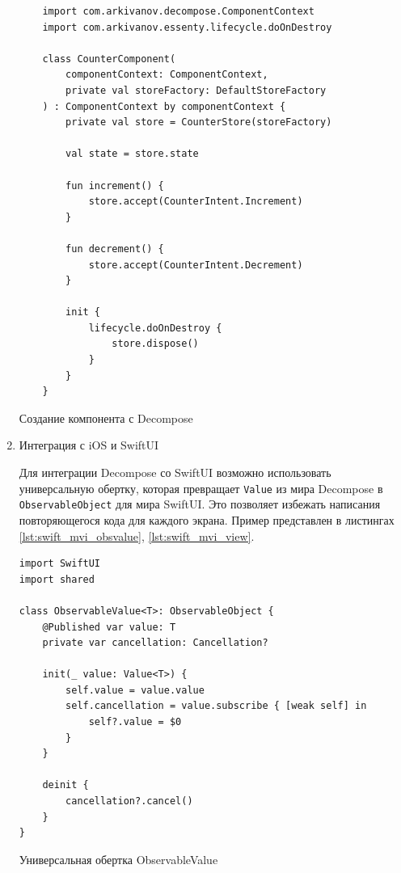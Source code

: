 \documentclass[14pt, russian]{scrartcl}
\begin{document}
\begin{enumerate}
    \begin{listing}[H]
    \begin{verbatim}
    import com.arkivanov.decompose.ComponentContext
    import com.arkivanov.essenty.lifecycle.doOnDestroy

    class CounterComponent(
        componentContext: ComponentContext,
        private val storeFactory: DefaultStoreFactory
    ) : ComponentContext by componentContext {
        private val store = CounterStore(storeFactory)

        val state = store.state

        fun increment() {
            store.accept(CounterIntent.Increment)
        }

        fun decrement() {
            store.accept(CounterIntent.Decrement)
        }

        init {
            lifecycle.doOnDestroy {
                store.dispose()
            }
        }
    }
    \end{verbatim}
    \caption{Создание компонента с Decompose}
    \label{lst:kotlin_mvi_component}
    \end{listing}

    \item Интеграция с iOS и SwiftUI

    Для интеграции Decompose со SwiftUI возможно использовать универсальную обертку, которая превращает \texttt{Value} из мира Decompose в \texttt{ObservableObject} для мира SwiftUI. Это позволяет избежать написания повторяющегося кода для каждого экрана. Пример представлен в листингах \ref{lst:swift_mvi_obsvalue}, \ref{lst:swift_mvi_view}.

    \begin{listing}[H]
    \begin{verbatim}
import SwiftUI
import shared

class ObservableValue<T>: ObservableObject {
    @Published var value: T
    private var cancellation: Cancellation?

    init(_ value: Value<T>) {
        self.value = value.value
        self.cancellation = value.subscribe { [weak self] in
            self?.value = $0
        }
    }

    deinit {
        cancellation?.cancel()
    }
}
    \end{verbatim}
    \caption{Универсальная обертка ObservableValue}
    \label{lst:swift_mvi_obsvalue}
    \end{listing}


\end{enumerate}
\end{document}
